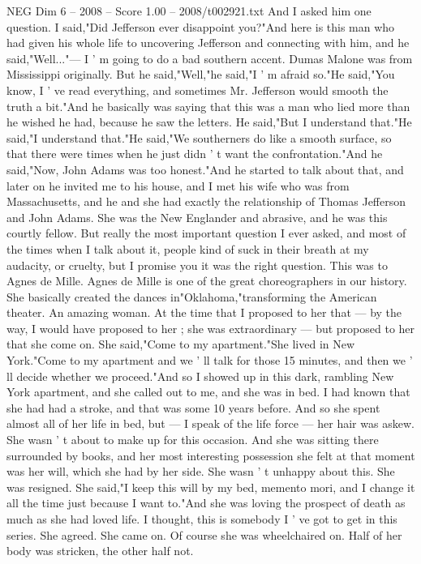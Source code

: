 \begin{textsample}{NEG Dim 6 – 2008 – Score 1.00 – 2008/t002921.txt}
And I asked him one question.
I said,"Did Jefferson ever disappoint you?"And here is this man who had given his whole life to uncovering Jefferson and connecting with him, and he said,"Well..."— I ' m going to do a bad southern accent.
Dumas Malone was from Mississippi originally.
But he said,"Well,"he said,"I ' m afraid so."He said,"You know, I ' ve read everything, and sometimes Mr.
Jefferson would smooth the truth a bit."And he basically was saying that this was a man who lied more than he wished he had, because he saw the letters.
He said,"But I understand that."He said,"I understand that."He said,"We southerners do like a smooth surface, so that there were times when he just didn ' t want the confrontation."And he said,"Now, John Adams was too honest."And he started to talk about that, and later on he invited me to his house, and I met his wife who was from Massachusetts, and he and she had exactly the relationship of Thomas Jefferson and John Adams.
She was the New Englander and abrasive, and he was this courtly fellow.
But really the most important question I ever asked, and most of the times when I talk about it, people kind of suck in their breath at my audacity, or cruelty, but I promise you it was the right question.
This was to Agnes de Mille.
Agnes de Mille is one of the great choreographers in our history.
She basically created the dances in"Oklahoma,"transforming the American theater.
An amazing woman.
At the time that I proposed to her that — by the way, I would have proposed to her ; she was extraordinary — but proposed to her that she come on.
She said,"Come to my apartment."She lived in New York."Come to my apartment and we ' ll talk for those 15 minutes, and then we ' ll decide whether we proceed."And so I showed up in this dark, rambling New York apartment, and she called out to me, and she was in bed.
I had known that she had had a stroke, and that was some 10 years before.
And so she spent almost all of her life in bed, but — I speak of the life force — her hair was askew.
She wasn ' t about to make up for this occasion.
And she was sitting there surrounded by books, and her most interesting possession she felt at that moment was her will, which she had by her side.
She wasn ' t unhappy about this.
She was resigned.
She said,"I keep this will by my bed, memento mori, and I change it all the time just because I want to."And she was loving the prospect of death as much as she had loved life.
I thought, this is somebody I ' ve got to get in this series.
She agreed.
She came on.
Of course she was wheelchaired on.
Half of her body was stricken, the other half not.

\end{textsample}
